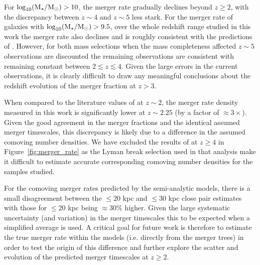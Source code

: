 For $\log_{10}(\text{M}_{\star} / \text{M}_{\odot}) > 10$, the merger rate gradually declines beyond $z\geq 2$, with the discrepancy between $z\sim4$ and $z\sim5$ less stark. For the merger rate of galaxies with $\log_{10}(\text{M}_{\star} / \text{M}_{\odot}) > 9.5$, over the whole redshift range studied in this work the merger rate also declines and is roughly consistent with the predictions of \citet{Lu:2011hj}. However, for both mass selections when the mass completeness affected $z\sim5$ observations are discounted the remaining observations are consistent with remaining constant between $2 \lesssim z \lesssim 4$. Given the large errors in the current observations, it is clearly difficult to draw any meaningful conclusions about the redshift evolution of the merger fraction at $z > 3$.
  
When compared to the literature values of \citet{RyanJr:2008ka} at $z\sim2$, the merger rate density measured in this work is significantly lower at $z\sim 2.25$ (by a factor of $\approx 3\times$). Given the good agreement in the merger fractions and the identical assumed merger timescales, this discrepancy is likely due to a difference in the assumed comoving number densities. We have excluded the results of \citet{2009MNRAS.397..208C} at $z\geq 4$ in Figure~\ref{fig:merger_rate} as the Lyman break selection used in that analysis make it difficult to estimate accurate corresponding comoving number densities for the samples studied.

For the comoving merger rates predicted by the semi-analytic models, there is a small disagreement between the $\leq 20$ kpc and $\leq 30$ kpc close pair estimates with those for $\leq 20$ kpc being $\approx 30\%$ higher. Given the large systematic uncertainty (and variation) in the merger timescales \citep{Lotz:2008kr,Lotz:2010hf,Lotz:2010ie} this to be expected when a simplified average is used. A critical goal for future work is therefore to estimate the true merger rate within the models (i.e. directly from the merger trees) in order to test the origin of this difference and further explore the scatter and evolution of the predicted merger timescales at $z\geq 2$.

